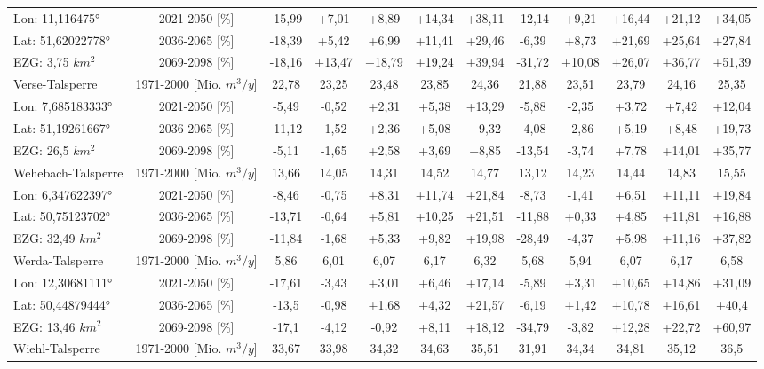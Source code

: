 \begin{longtable}{@{\extracolsep{\fill}}lc|ccccc||ccccc}
\cline{2-12} 
Lon: 11,116475° & 2021-2050 [\%]  & -15,99 & +7,01 & +8,89 & +14,34 & +38,11 & -12,14 & +9,21 & +16,44 & +21,12 & +34,05\\ 
Lat: 51,62022778° & 2036-2065 [\%]  & -18,39 & +5,42 & +6,99 & +11,41 & +29,46 & -6,39 & +8,73 & +21,69 & +25,64 & +27,84\\ 
EZG: 3,75 $km^2$ & 2069-2098 [\%]  & -18,16 & +13,47 & +18,79 & +19,24 & +39,94 & -31,72 & +10,08 & +26,07 & +36,77 & +51,39\\ 
\hline 
Verse-Talsperre & 1971-2000 [Mio. $m^3/y$]  & 22,78 & 23,25 & 23,48 & 23,85 & 24,36 & 21,88 & 23,51 & 23,79 & 24,16 & 25,35\\ 
\cline{2-12} 
Lon: 7,685183333° & 2021-2050 [\%]  & -5,49 & -0,52 & +2,31 & +5,38 & +13,29 & -5,88 & -2,35 & +3,72 & +7,42 & +12,04\\ 
Lat: 51,19261667° & 2036-2065 [\%]  & -11,12 & -1,52 & +2,36 & +5,08 & +9,32 & -4,08 & -2,86 & +5,19 & +8,48 & +19,73\\ 
EZG: 26,5 $km^2$ & 2069-2098 [\%]  & -5,11 & -1,65 & +2,58 & +3,69 & +8,85 & -13,54 & -3,74 & +7,78 & +14,01 & +35,77\\ 
\hline 
Wehebach-Talsperre & 1971-2000 [Mio. $m^3/y$]  & 13,66 & 14,05 & 14,31 & 14,52 & 14,77 & 13,12 & 14,23 & 14,44 & 14,83 & 15,55\\ 
\cline{2-12} 
Lon: 6,347622397° & 2021-2050 [\%]  & -8,46 & -0,75 & +8,31 & +11,74 & +21,84 & -8,73 & -1,41 & +6,51 & +11,11 & +19,84\\ 
Lat: 50,75123702° & 2036-2065 [\%]  & -13,71 & -0,64 & +5,81 & +10,25 & +21,51 & -11,88 & +0,33 & +4,85 & +11,81 & +16,88\\ 
EZG: 32,49 $km^2$ & 2069-2098 [\%]  & -11,84 & -1,68 & +5,33 & +9,82 & +19,98 & -28,49 & -4,37 & +5,98 & +11,16 & +37,82\\ 
\hline 
Werda-Talsperre & 1971-2000 [Mio. $m^3/y$]  & 5,86 & 6,01 & 6,07 & 6,17 & 6,32 & 5,68 & 5,94 & 6,07 & 6,17 & 6,58\\ 
\cline{2-12} 
Lon: 12,30681111° & 2021-2050 [\%]  & -17,61 & -3,43 & +3,01 & +6,46 & +17,14 & -5,89 & +3,31 & +10,65 & +14,86 & +31,09\\ 
Lat: 50,44879444° & 2036-2065 [\%]  & -13,5 & -0,98 & +1,68 & +4,32 & +21,57 & -6,19 & +1,42 & +10,78 & +16,61 & +40,4\\ 
EZG: 13,46 $km^2$ & 2069-2098 [\%]  & -17,1 & -4,12 & -0,92 & +8,11 & +18,12 & -34,79 & -3,82 & +12,28 & +22,72 & +60,97\\ 
\hline 
Wiehl-Talsperre & 1971-2000 [Mio. $m^3/y$]  & 33,67 & 33,98 & 34,32 & 34,63 & 35,51 & 31,91 & 34,34 & 34,81 & 35,12 & 36,5\\ 

\end{longtable}
